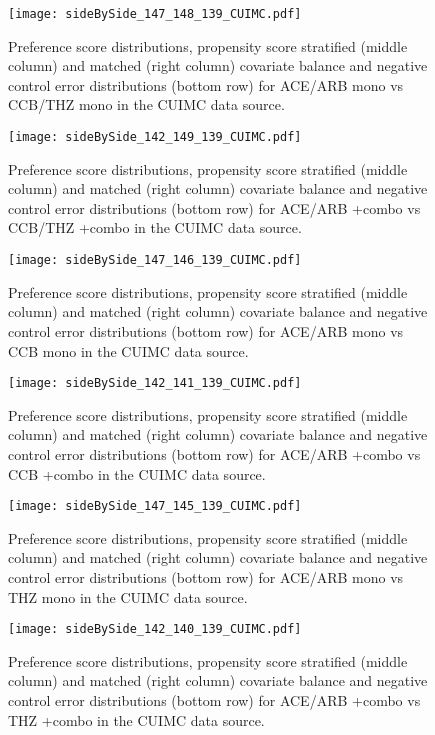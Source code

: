 \documentclass[11pt,]{article}
\begin{document}
\begin{figure}
    \caption{Preference score distributions,
    propensity score stratified (middle column) and matched (right column) covariate balance
    and negative control error distributions (bottom row) for
    ACE/ARB mono vs CCB/THZ mono in the CUIMC data source.}
    \centerline{
        \texttt{[image: sideBySide\_147\_148\_139\_CUIMC.pdf]}
    }
\end{figure}
\begin{figure}
    \caption{Preference score distributions,
    propensity score stratified (middle column) and matched (right column) covariate balance
    and negative control error distributions (bottom row) for
    ACE/ARB +combo vs CCB/THZ +combo in the CUIMC data source.}
    \centerline{
        \texttt{[image: sideBySide\_142\_149\_139\_CUIMC.pdf]}
    }
\end{figure}
\begin{figure}
    \caption{Preference score distributions,
    propensity score stratified (middle column) and matched (right column) covariate balance
    and negative control error distributions (bottom row) for
    ACE/ARB mono vs CCB mono in the CUIMC data source.}
    \centerline{
        \texttt{[image: sideBySide\_147\_146\_139\_CUIMC.pdf]}
    }
\end{figure}
\begin{figure}
    \caption{Preference score distributions,
    propensity score stratified (middle column) and matched (right column) covariate balance
    and negative control error distributions (bottom row) for
    ACE/ARB +combo vs CCB +combo in the CUIMC data source.}
    \centerline{
        \texttt{[image: sideBySide\_142\_141\_139\_CUIMC.pdf]}
    }
\end{figure}
\begin{figure}
    \caption{Preference score distributions,
    propensity score stratified (middle column) and matched (right column) covariate balance
    and negative control error distributions (bottom row) for
    ACE/ARB mono vs THZ mono in the CUIMC data source.}
    \centerline{
        \texttt{[image: sideBySide\_147\_145\_139\_CUIMC.pdf]}
    }
\end{figure}
\begin{figure}
    \caption{Preference score distributions,
    propensity score stratified (middle column) and matched (right column) covariate balance
    and negative control error distributions (bottom row) for
    ACE/ARB +combo vs THZ +combo in the CUIMC data source.}
    \centerline{
        \texttt{[image: sideBySide\_142\_140\_139\_CUIMC.pdf]}
    }
\end{figure}
\end{document}
